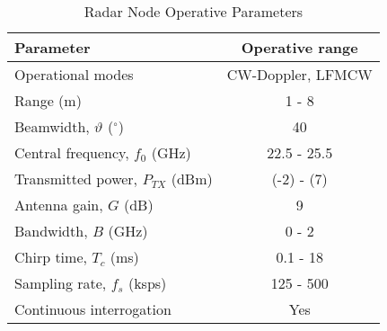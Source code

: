 \begin{table}[t]
	\caption{Radar Node Operative Parameters}
	\begin{center}
		\begin{tabular}{lc}
			\hline 
			\textbf{Parameter} 								& \textbf{Operative range}		\\
			\hline
			Operational modes								& CW-Doppler, LFMCW				\\
			Range (m)										& 1 - 8								\\
			Beamwidth, $\vartheta$ ($^\circ$)	    		& 40								\\
			Central frequency, $f_0$ (GHz) 					& 22.5 - 25.5						\\
			Transmitted power, $P_{TX}$ (dBm)				& (-2) - (7) 							\\
			Antenna gain, $G$ (dB)							& 9									\\
			Bandwidth, $B$ (GHz)								& 0 - 2							\\
			Chirp time, $T_c$ (ms)							& 0.1 - 18							\\
			Sampling rate, $f_s$ (ksps)					 	& 125 - 500							\\
			Continuous interrogation						& Yes
			\\ \hline    
		\end{tabular}
		\label{tab:node_requirements}
	\end{center}
\end{table}